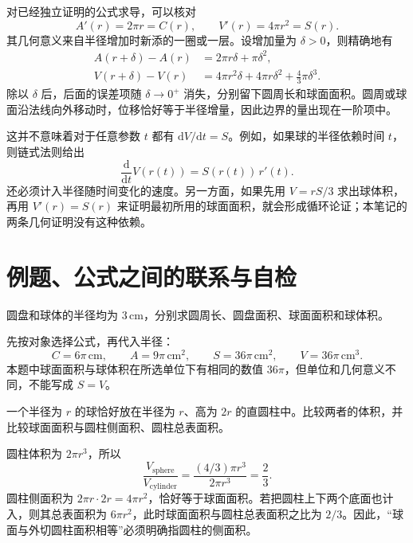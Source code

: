 \documentclass[UTF8,12pt,a4paper,fontset=fandol]{ctexart}
\begin{document}
对已经独立证明的公式求导，可以核对
\begin{equation}\label{eq:cs-radius-derivatives}
  A'(r)=2\pi r=C(r),\qquad
  V'(r)=4\pi r^2=S(r).
\end{equation}
其几何意义来自半径增加时新添的一圈或一层。设增加量为 $\delta>0$，则精确地有
\begin{align*}
  A(r+\delta)-A(r)
  &=2\pi r\delta+\pi\delta^2,\\
  V(r+\delta)-V(r)
  &=4\pi r^2\delta+4\pi r\delta^2+\frac43\pi\delta^3.
\end{align*}
除以 $\delta$ 后，后面的误差项随 $\delta\to0^+$ 消失，分别留下圆周长和球面面积。圆周或球面沿法线向外移动时，位移恰好等于半径增量，因此边界的量出现在一阶项中。

这并不意味着对于任意参数 $t$ 都有 $\mathrm{d}V/\mathrm{d}t=S$。例如，如果球的半径依赖时间 $t$，则链式法则给出
\[
  \frac{\mathrm{d}}{\mathrm{d}t}V(r(t))
  =S(r(t))\,r'(t).
\]
还必须计入半径随时间变化的速度。另一方面，如果先用 $V=rS/3$ 求出球体积，再用 $V'(r)=S(r)$ 来证明最初所用的球面面积，就会形成循环论证；本笔记的两条几何证明没有这种依赖。

\section{例题、公式之间的联系与自检}
\label{sec:cs-examples}

\begin{example}[相同半径下四个量的区别]
圆盘和球体的半径均为 $3\,\mathrm{cm}$，分别求圆周长、圆盘面积、球面面积和球体积。
\end{example}
\begin{solve}
先按对象选择公式，再代入半径：
\[
  C=6\pi\,\mathrm{cm},\qquad A=9\pi\,\mathrm{cm}^2,
  \qquad S=36\pi\,\mathrm{cm}^2,\qquad V=36\pi\,\mathrm{cm}^3.
\]
本题中球面面积与球体积在所选单位下有相同的数值 $36\pi$，但单位和几何意义不同，不能写成 $S=V$。
\end{solve}

\begin{example}[球与外切圆柱]
一个半径为 $r$ 的球恰好放在半径为 $r$、高为 $2r$ 的直圆柱中。比较两者的体积，并比较球面面积与圆柱侧面积、圆柱总表面积。
\end{example}
\begin{solve}
圆柱体积为 $2\pi r^3$，所以
\[
  \frac{V_{\mathrm{sphere}}}{V_{\mathrm{cylinder}}}
  =\frac{(4/3)\pi r^3}{2\pi r^3}=\frac23.
\]
圆柱侧面积为 $2\pi r\cdot2r=4\pi r^2$，恰好等于球面面积。若把圆柱上下两个底面也计入，则其总表面积为 $6\pi r^2$，此时球面面积与圆柱总表面积之比为 $2/3$。因此，“球面与外切圆柱面积相等”必须明确指圆柱的侧面积。
\end{solve}
\end{document}
